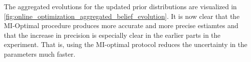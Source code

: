The aggregated evolutions for the updated prior distributions are
visualized in \cref{fig:online_optimization_aggregated_belief_evolution}. It is now clear that
the MI-Optimal procedure produces more accurate and more precise estiamtes and
that the increase in precision is especially clear in the earlier parts in the
experiment. That is, using the MI-optimal protocol reduces the uncertainty in
the parameters much faster.

